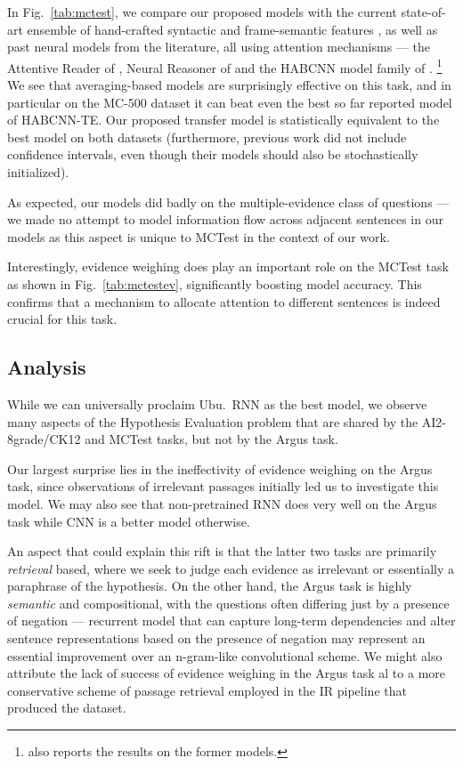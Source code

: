 \documentclass[11pt]{article}
\begin{document}
In Fig.~\ref{tab:mctest}, we compare our proposed models with the current state-of-art
ensemble of hand-crafted syntactic and frame-semantic features \cite{MCWang},
as well as past neural models
from the literature, all using attention mechanisms --- the Attentive Reader of \cite{ReadComprehend},
Neural Reasoner of \cite{NeuralReasoner} and the HABCNN model family of \cite{HABCNN}.%
\footnote{\cite{HABCNN} also reports the results on the former models.}
We see that averaging-based models are surprisingly effective on this task,
and in particular on the MC-500 dataset it can beat even the best so far reported model of HABCNN-TE.\@
Our proposed transfer model is statistically equivalent to the best model on both datasets
(furthermore, previous work did not include
confidence intervals, even though their models should also be stochastically initialized).

As expected, our models did badly on the multiple-evidence class of questions
--- we made no attempt to model information flow across adjacent sentences in our
models as this aspect is unique to MCTest in the
context of our work.


Interestingly, evidence weighing does play an important role on the MCTest task
as shown in Fig.~\ref{tab:mctestev},
significantly boosting model accuracy.
This confirms that a mechanism to allocate attention to different sentences
is indeed crucial for this task.

\subsection{Analysis}

While we can universally proclaim Ubu.\ RNN as the best model,
we observe many aspects of the Hypothesis Evaluation problem that are shared
by the AI2-8grade/CK12 and MCTest tasks, but not by the Argus task.

Our largest surprise lies in the ineffectivity of evidence weighing
on the Argus task, since observations of irrelevant passages initially
led us to investigate this model.  %
We may also see that non-pretrained RNN does very well on the Argus task
while CNN is a better model otherwise.

An aspect that could explain this rift is that the latter two tasks
are primarily \textit{retrieval} based, where we seek to judge each
evidence as irrelevant or essentially a paraphrase of the hypothesis.
On the other hand, the Argus task is highly \textit{semantic}
and compositional, with the questions often differing just by a presence
of negation --- recurrent model that can capture long-term dependencies
and alter sentence representations based on the presence of negation
may represent an essential improvement over an n-gram-like convolutional
scheme.
We might also attribute the lack of success of evidence weighing in the Argus task al
to a more conservative scheme of passage retrieval employed
in the IR pipeline that produced the dataset.
\end{document}
